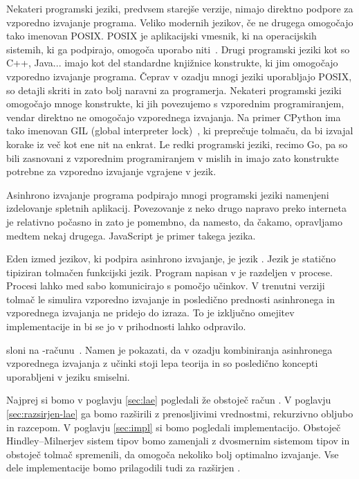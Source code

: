 


Nekateri programski jeziki, predvsem starejše verzije, nimajo direktno podpore za vzporedno izvajanje programa. 
Veliko modernih jezikov, če ne drugega omogočajo tako imenovan POSIX. POSIX je aplikacijski vmesnik, ki na operacijskih sistemih, ki ga podpirajo, omogoča uporabo niti~\cite{posix}.
Drugi programski jeziki kot so C++, Java... imajo kot del standardne knjižnice konstrukte, ki jim omogočajo vzporedno izvajanje programa. Čeprav v ozadju mnogi jeziki uporabljajo POSIX, so detajli skriti in zato bolj naravni za programerja. 
Nekateri programski jeziki omogočajo mnoge konstrukte, ki jih povezujemo s vzporednim programiranjem, vendar direktno ne omogočajo vzporednega izvajanja. Na primer CPython ima tako imenovan GIL (global  interpreter lock)~\cite{gil}, ki preprečuje tolmaču, da bi izvajal korake iz več kot ene nit na enkrat.
Le redki programski jeziki, recimo Go, pa so bili zasnovani z vzporednim programiranjem v mislih in imajo zato konstrukte potrebne za vzporedno izvajanje vgrajene v jezik.

Asinhrono izvajanje programa podpirajo mnogi programski jeziki namenjeni izdelovanje spletnih aplikacij. Povezovanje z neko drugo napravo preko interneta je relativno počasno in zato je pomembno, da namesto, da čakamo, opravljamo medtem nekaj drugega. JavaScript je primer takega jezika. 



Eden izmed jezikov, ki podpira asinhrono izvajanje, je jezik \aeff{}. Jezik \aeff{} je statično tipiziran tolmačen funkcijski jezik. Program napisan v \aeff{} je razdeljen v procese. Procesi lahko med sabo komunicirajo s pomočjo učinkov. V trenutni verziji tolmač le simulira vzporedno izvajanje in posledično prednosti asinhronega in vzporednega izvajanja ne pridejo do izraza. To je izključno omejitev implementacije in bi se jo v prihodnosti lahko odpravilo.

\aeff{} sloni na \lae{}-računu~\cite{aeff}. Namen \lae{} je pokazati, da v ozadju kombiniranja asinhronega vzporednega izvajanja z učinki stoji lepa teorija in so posledično koncepti uporabljeni v jeziku \aeff{} smiselni.  
 





Najprej si bomo v poglavju \ref{sec:lae} pogledali že obstoječ račun \lae{}. V poglavju \ref{sec:razsirjen-lae} ga bomo razširili z prenosljivimi vrednostmi, rekurzivno obljubo in razcepom. V poglavju \ref{sec:impl} si bomo pogledali implementacijo. Obstoječ Hindley–Milnerjev sistem tipov bomo zamenjali z dvosmernim sistemom tipov in obstoječ tolmač spremenili, da omogoča nekoliko bolj optimalno izvajanje. Vse dele implementacije bomo prilagodili tudi za razširjen \lae.
